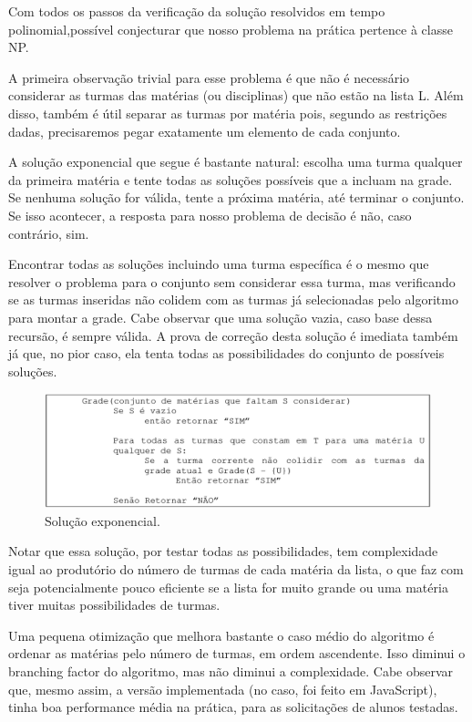 \documentclass[graduacao,brazil]{ThesisPUC}
\begin{document}
Com todos os passos da verificação da solução resolvidos em tempo polinomial,possível conjecturar que nosso problema na prática pertence à classe NP.

A primeira observação trivial para esse problema é que não é necessário considerar as turmas das matérias (ou disciplinas) que não estão na lista L. Além disso, também é útil separar as turmas por matéria pois, segundo as restrições dadas, precisaremos pegar exatamente um elemento de cada conjunto.

A solução exponencial que segue é bastante natural: escolha uma turma qualquer da primeira matéria e tente todas as soluções possíveis que a incluam na grade. Se nenhuma solução for válida, tente a próxima matéria, até terminar o conjunto. Se isso acontecer, a resposta para nosso problema de decisão é não, caso contrário, sim.

Encontrar todas as soluções incluindo uma turma específica é o mesmo que resolver o problema para o conjunto sem considerar essa turma, mas verificando se as turmas inseridas não colidem com as turmas já selecionadas pelo algoritmo para montar a grade. Cabe observar que uma solução vazia, caso base dessa recursão, é sempre válida. A prova de correção desta solução é imediata também já que, no pior caso, ela tenta todas as possibilidades do conjunto de possíveis soluções.

\begin{figure}[H]
    \centering
    \includegraphics[width=\linewidth]{img/algoritmo_grade.png}
    \caption{Solução exponencial.}
\end{figure}

Notar que essa solução, por testar todas as possibilidades, tem complexidade igual ao produtório do número de turmas de cada matéria da lista, o que faz com seja potencialmente pouco eficiente se a lista for muito grande ou uma matéria tiver muitas possibilidades de turmas.

Uma pequena otimização que melhora bastante o caso médio do algoritmo é ordenar as matérias pelo número de turmas, em ordem ascendente. Isso diminui o branching factor do algoritmo, mas não diminui a complexidade. Cabe observar que, mesmo assim, a versão implementada (no caso, foi feito em JavaScript), tinha boa performance média na prática, para as solicitações de alunos testadas.
\end{document}
